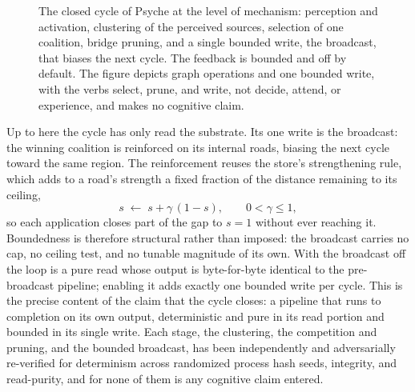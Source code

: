 \documentclass[conference]{IEEEtran}
\begin{document}
\begin{figure}[t]
  \centering
  \caption{The closed cycle of Psyche at the level of mechanism: perception and activation,
    clustering of the perceived sources, selection of one coalition, bridge pruning, and a
    single bounded write, the broadcast, that biases the next cycle. The feedback is bounded
    and off by default. The figure depicts graph operations and one bounded write, with the
    verbs select, prune, and write, not decide, attend, or experience, and makes no cognitive
    claim.}
  \label{fig:cycle}
\end{figure}

Up to here the cycle has only read the substrate. Its one write is the broadcast: the
winning coalition is reinforced on its internal roads, biasing the next cycle toward the
same region. The reinforcement reuses the store's strengthening rule, which adds to a road's
strength a fixed fraction of the distance remaining to its ceiling,
\begin{equation}
  s \;\leftarrow\; s + \gamma\,(1 - s), \qquad 0 < \gamma \le 1,
\end{equation}
so each application closes part of the gap to $s = 1$ without ever reaching it. Boundedness
is therefore structural rather than imposed: the broadcast carries no cap, no ceiling test,
and no tunable magnitude of its own. With the broadcast off the loop is a pure read whose
output is byte-for-byte identical to the pre-broadcast pipeline; enabling it adds exactly one
bounded write per cycle. This is the precise content of the claim that the cycle closes: a
pipeline that runs to completion on its own output, deterministic and pure in its read
portion and bounded in its single write. Each stage, the clustering, the competition and
pruning, and the bounded broadcast, has been independently and adversarially re-verified for
determinism across randomized process hash seeds, integrity, and read-purity, and for none of
them is any cognitive claim entered.
\end{document}
